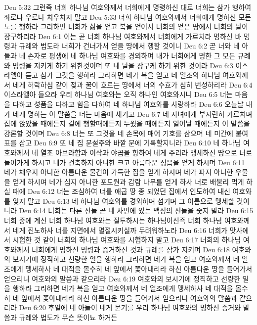 Deu 5:32  그런즉 너희 하나님 여호와께서 너희에게 명령하신 대로 너희는 삼가 행하여 좌로나 우로나 치우치지 말고
Deu 5:33  너희 하나님 여호와께서 너희에게 명하신 모든 도를 행하라 그리하면 너희가 삶을 얻고 복을 얻어서 너희의 얻은 땅에서 너희의 날이 장구하리라
Deu 6:1  이는 곧 너희 하나님 여호와께서 너희에게 가르치라 명하신 바 명령과 규례와 법도라 너희가 건너가서 얻을 땅에서 행할 것이니
Deu 6:2  곧 너와 네 아들과 네 손자로 평생에 네 하나님 여호와를 경외하며 내가 너희에게 명한 그 모든 규례와 명령을 지키게 하기 위한것이며 또 네 날을 장구케 하기 위한 것이라
Deu 6:3  이스라엘아 듣고 삼가 그것을 행하라 그리하면 네가 복을 얻고 네 열조의 하나님 여호와께서 네게 허락하심 같이 젖과 꿀이 흐르는 땅에서 너의 수효가 심히 번성하리라
Deu 6:4  이스라엘아 들으라 우리 하나님 여호와는 오직 하나인 여호와시니
Deu 6:5  너는 마음을 다하고 성품을 다하고 힘을 다하여 네 하나님 여호와를 사랑하라
Deu 6:6  오늘날 내가 네게 명하는 이 말씀을 너는 마음에 새기고
Deu 6:7  네 자녀에게 부지런히 가르치며 집에 앉았을 때에든지 길에 행할때에든지 누웠을 때에든지 일어날 때에든지 이 말씀을 강론할 것이며
Deu 6:8  너는 또 그것을 네 손목에 매어 기호를 삼으며 네 미간에 붙여 표를 삼고
Deu 6:9  또 네 집 문설주와 바깥 문에 기록할지니라
Deu 6:10  네 하나님 여호와께서 네 열조 아브라함과 이삭과 야곱을 향하여 네게 주리라 맹세하신 땅으로 너로 들어가게 하시고 네가 건축하지 아니한 크고 아름다운 성읍을 얻게 하시며
Deu 6:11  네가 채우지 아니한 아름다운 물건이 가득한 집을 얻게 하시며 네가 파지 아니한 우물을 얻게 하시며 네가 심지 아니한 포도원과 감람 나무를 얻게 하사 너로 배불리 먹게 하실 때에
Deu 6:12  너는 조심하여 너를 애굽 땅 종 되었던 집에서 인도하여 내신 여호와를 잊지 말고
Deu 6:13  네 하나님 여호와를 경외하며 섬기며 그 이름으로 맹세할 것이니라
Deu 6:14  너희는 다른 신들 곧 네 사면에 있는 백성의 신들을 좇지 말라
Deu 6:15  너희 중에 계신 너희 하나님 여호와는 질투하시는 하나님이신즉 너희 하나님 여호와께서 네게 진노하사 너를 지면에서 멸절시키실까 두려워하노라
Deu 6:16  너희가 맛사에서 시험한 것 같이 너희의 하나님 여호와를 시험하지 말고
Deu 6:17  너희의 하나님 여호와께서 너희에게 명하신 명령과 증거하신 것과 규례를 삼가 지키며
Deu 6:18  여호와의 보시기에 정직하고 선량한 일을 행하라 그리하면 네가 복을 얻고 여호와께서 네 열조에게 맹세하사 네 대적을 몰수히 네 앞에서 쫓아내리라 하신 아름다운 땅을 들어가서 얻으리니 여호와의 말씀과 같으리라
Deu 6:19  여호와의 보시기에 정직하고 선량한 일을 행하라 그리하면 네가 복을 얻고 여호와께서 네 열조에게 맹세하사 네 대적을 몰수히 네 앞에서 쫓아내리라 하신 아름다운 땅을 들어가서 얻으리니 여호와의 말씀과 같으리라
Deu 6:20  후일에 네 아들이 네게 묻기를 우리 하나님 여호와의 명하신 증거와 말씀과 규례와 법도가 무슨 뜻이뇨 하거든

